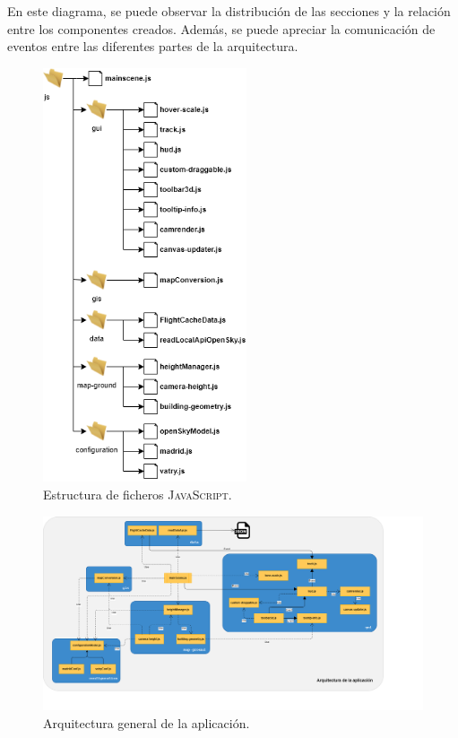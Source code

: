 \documentclass[a4paper, 11pt]{book}
\begin{document}
En este diagrama, se puede observar la distribución de las secciones y la relación entre los componentes creados. Además, se puede apreciar la comunicación de eventos entre las diferentes partes de la arquitectura.
\begin{figure}[h]
  \centering
  \includegraphics[width=6cm, keepaspectratio]{img/ficheros.drawio.png}
  \caption{Estructura de ficheros \textsc{JavaScript}.}
  \label{fig:javascriptFiles}
\end{figure}

\begin{center}
\begin{figure}[h]
  \centering
  \includegraphics[width=18cm, keepaspectratio]{img/Arquitectura.png}
  \caption{Arquitectura general de la aplicación.}
  \label{fig:arquitectura}
\end{figure}
\end{center}
\end{document}
